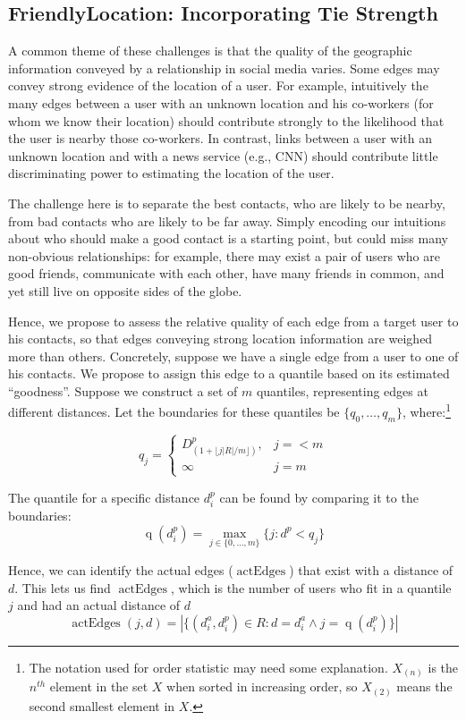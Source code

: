 \documentclass[letterpaper]{article}
\DeclareMathOperator{\actEdges}{actEdges}
\DeclareMathOperator{\quantile}{q}
\begin{document}
\subsection{FriendlyLocation: Incorporating Tie Strength}
A common theme of these challenges is that the quality of the geographic information conveyed by a relationship in social media varies. Some edges may convey strong evidence of the location of a user. For example, intuitively the many edges between a user with an unknown location and his co-workers (for whom we know their location) should contribute strongly to the likelihood that the user is nearby those co-workers. In contrast, links between a user with an unknown location and with a news service (e.g., CNN) should contribute little discriminating power to estimating the location of the user.

The challenge here is to separate the best contacts, who are likely to be nearby, from bad contacts who are likely to be far away. Simply encoding our intuitions about who should make a good contact is a starting point, but could miss many non-obvious relationships: for example, there may exist a pair of users who are good friends, communicate with each other, have many friends in common, and yet still live on opposite sides of the globe. 

Hence, we propose to assess the relative quality of each edge from a target user to his contacts, so that edges conveying strong location information are weighed more than others. Concretely, suppose we have a single edge from a user to one of his contacts. We propose to assign this edge to a quantile based on its estimated ``goodness''. Suppose we construct a set of $m$ quantiles, representing edges at different distances. Let the boundaries for these quantiles be  $\{q_0,\dots,q_m\}$, where:\footnote{The notation used for order statistic may need some explanation.  $X_{(n)}$ is the $n^{th}$ element in the set $X$ when sorted in increasing order, so $X_{(2)}$ means the second smallest element in $X$.}

\[
    q_j =
    \begin{cases}
        D^p_{(1+\lfloor j|R|/m \rfloor)}, & j=<m \\
        \infty & j=m
    \end{cases}
\]

\noindent The quantile for a specific distance $d^p_i$ can be found by comparing it to the boundaries:
\[
    \quantile(d^p_i) = \max_{j \in \{0,\dots,m\}} \{j: d^p<q_j\}
\]

Hence, we can identify the actual edges ($\actEdges$) that exist with a distance of $d$. This lets us find $\actEdges$, which is the number of users who fit in a quantile $j$ and had an actual distance of $d$
\[
    \actEdges(j,d) = |\{
            (d^a_i,d^p_i) \in R :
            d=d^a_i \wedge j=\quantile(d^p_i)
        \}|
\]
\end{document}
